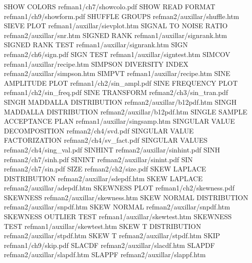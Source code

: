 SHOW COLORS                             refman1/ch7/showcolo.pdf
SHOW READ FORMAT                        refman1/ch9/showform.pdf
SHUFFLE GROUPS                          refman2/auxillar/shuffle.htm
SIEVE PLOT                              refman1/auxillar/sievplot.htm
SIGNAL TO NOISE RATIO                   refman2/auxillar/snr.htm
SIGNED RANK                             refman1/auxillar/signrank.htm
SIGNED RANK TEST                        refman1/auxillar/signrank.htm
SIGN                                    refman2/ch6/sign.pdf
SIGN TEST                               refman1/auxillar/signtest.htm
SIMCOV                                  refman1/auxillar/recipe.htm
SIMPSON DIVERSITY INDEX                 refman2/auxillar/simpson.htm
SIMPVT                                  refman1/auxillar/recipe.htm
SINE AMPLITUDE PLOT                     refman1/ch2/sin_ampl.pdf
SINE FREQUENCY PLOT                     refman1/ch2/sin_freq.pdf
SINE TRANSFORM                          refman2/ch3/sin_tran.pdf
SINGH MADDALLA DISTRIBUTION             refman2/auxillar/b12pdf.htm
SINGH MADDALLA DISTRIBUTION             refman2/auxillar/b12pdf.htm
SINGLE SAMPLE ACCEPTANCE PLAN           refman1/auxillar/singsamp.htm
SINGULAR VALUE DECOMPOSITION            refman2/ch4/svd.pdf
SINGULAR VALUE FACTORIZATION            refman2/ch4/sv_fact.pdf
SINGULAR VALUES                         refman2/ch4/sing_val.pdf
SINHINT                                 refman2/auxillar/sinhint.pdf
SINH                                    refman2/ch7/sinh.pdf
SININT                                  refman2/auxillar/sinint.pdf
SIN                                     refman2/ch7/sin.pdf
SIZE                                    refman2/ch2/size.pdf
SKEW LAPLACE DISTRIBUTION               refman2/auxillar/sdepdf.htm
SKEW LAPLACE                            refman2/auxillar/adepdf.htm
SKEWNESS PLOT                           refman1/ch2/skewness.pdf
SKEWNESS                                refman2/auxillar/skewness.htm
SKEW NORMAL DISTRIBUTION                refman2/auxillar/snpdf.htm
SKEW NORMAL                             refman2/auxillar/snpdf.htm
SKEWNESS OUTLIER TEST                   refman1/auxillar/skewtest.htm
SKEWNESS TEST                           refman1/auxillar/skewtest.htm
SKEW T DISTRIBUTION                     refman2/auxillar/stpdf.htm
SKEW T                                  refman2/auxillar/stpdf.htm
SKIP                                    refman1/ch9/skip.pdf
SLACDF                                  refman2/auxillar/slacdf.htm
SLAPDF                                  refman2/auxillar/slapdf.htm
SLAPPF                                  refman2/auxillar/slappf.htm
